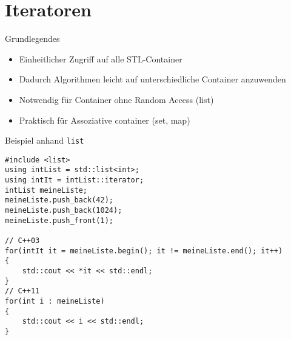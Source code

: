 \section{Iteratoren}

\begin{frame}[fragile]{Grundlegendes}
	\begin{itemize}
		\item Einheitlicher Zugriff auf alle STL-Container
		\item Dadurch Algorithmen leicht auf unterschiedliche Container anzuwenden
		\item Notwendig für Container ohne Random Access (list)
		\item Praktisch für Assoziative container (set, map)
	\end{itemize}
\end{frame}

\begin{frame}[fragile]{Beispiel anhand \texttt{list}}
	
	\begin{lstlisting}[]
#include <list>
using intList = std::list<int>;
using intIt = intList::iterator;
intList meineListe;
meineListe.push_back(42);
meineListe.push_back(1024);
meineListe.push_front(1);

// C++03
for(intIt it = meineListe.begin(); it != meineListe.end(); it++)
{
    std::cout << *it << std::endl;
}
// C++11
for(int i : meineListe)
{
    std::cout << i << std::endl;
}
	\end{lstlisting}
\end{frame}

